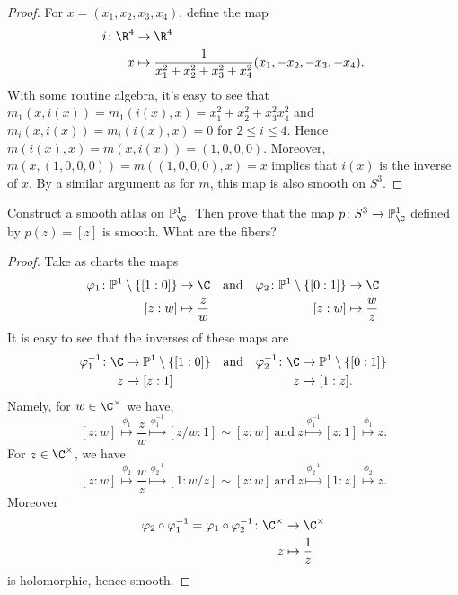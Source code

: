 \documentclass[10pt]{amsart}
\begin{document}
\begin{thm}
\begin{proof}
    For $x = (x_1, x_2, x_3, x_4)$, define the map
    \begin{align*}
      i \colon \R^4 &\rightarrow \R^4\\
      x &\mapsto \frac{1}{x_1^2 + x_2^2 + x_3^2 + x_4^2} (x_1, -x_2, -x_3, -x_4).
    \end{align*}
    With some routine algebra, it's easy to see that $m_1(x,i(x)) = m_1(i(x), x) = x_1^2 + x_2^2 + x_3^2 x_4^2$ and $m_i(x,i(x)) = m_i(i(x), x) = 0$ for $2 \leq i \leq 4$.
    Hence $m(i(x), x) = m(x, i(x)) = (1,0,0,0)$.
    Moreover, $m(x, (1,0,0,0)) = m((1,0,0,0), x) = x$ implies that $i(x)$ is the inverse of $x$.
    By a similar argument as for $m$, this map is also smooth on $S^3$.
  \end{proof}
\end{thm}

\begin{thm}
  Construct a smooth atlas on $\mathbb{P}^1_\C$.
  Then prove that the map $p \colon S^3 \rightarrow \mathbb{P}^1_\C$ defined by $p(z) = [z]$ is smooth.
  What are the fibers?

  \begin{proof}
    Take as charts the maps
    \begin{align*}
      \varphi_1 \colon \mathbb{P}^1 \setminus \left\{[1 : 0]\right\} &\rightarrow \C & \text{and} & & \varphi_2 \colon \mathbb{P}^1 \setminus \left\{[0 : 1]\right\} & \rightarrow \C\\
             [z : w] & \mapsto \frac{z}{w} & & & [z : w] & \mapsto \frac{w}{z}
    \end{align*}
    It is easy to see that the inverses of these maps are
    \begin{align*}
      \varphi_1^{-1} \colon \C &\rightarrow \mathbb{P}^1 \setminus \left\{[1 : 0]\right\} & \text{and} & & \varphi_2^{-1} \colon \C & \rightarrow \mathbb{P}^1 \setminus \left\{[0 : 1]\right\}\\
      z & \mapsto \left[z : 1 \right] & & & z & \mapsto [1 : z].
    \end{align*}
    Namely, for $w \in \C^\times$ we have, 
    $$[z : w] \overset{\phi_1}{\mapsto} \frac{z}{w} \overset{\phi_1^{-1}}{\mapsto} [z/w : 1] \sim [z : w]\ 
    \text{and}\ z \overset{\phi_1^{-1}}{\mapsto} [z : 1] \overset{\phi_1}{\mapsto} z.$$
    For $z \in \C^\times$, we have
    $$[z : w] \overset{\phi_2}{\mapsto} \frac{w}{z} \overset{\phi_2^{-1}}{\mapsto} [1 : w/z] \sim [z : w]\ 
    \text{and}\ z \overset{\phi_2^{-1}}{\mapsto} [1 : z] \overset{\phi_2}{\mapsto} z.$$
    Moreover
    \begin{align*}
      \varphi_2 \circ \varphi_1^{-1}  = \varphi_1 \circ \varphi_2^{-1} \colon \C^\times &\rightarrow \C^\times\\
      z &\mapsto \frac{1}{z}
    \end{align*}
    is holomorphic, hence smooth.


\end{proof}
\end{thm}
\end{document}
